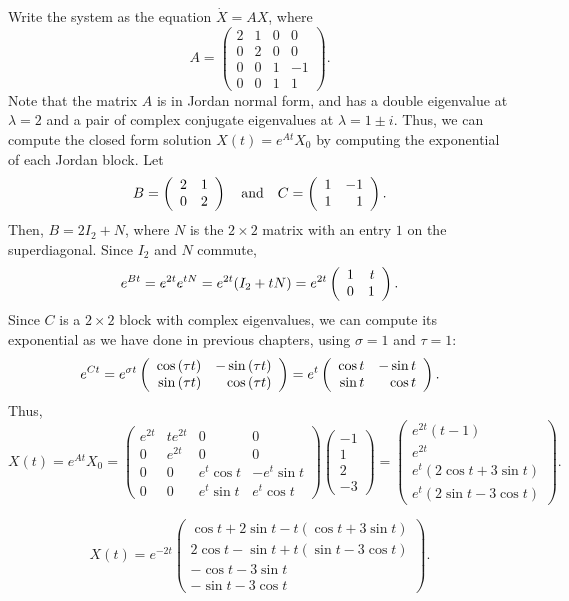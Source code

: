 \documentclass{ximera}
\begin{document}
\soln Write the system as the equation $\dot{X} = AX$, where
\[
A =
\left(\begin{array}{rrrr}
2 & 1 & 0 & 0 \\
0 & 2 & 0 & 0 \\
0 & 0 & 1 & -1 \\
0 & 0 & 1 & 1
\end{array}\right).
\]
Note that the matrix $A$ is in Jordan normal form, and has a double
eigenvalue at $\lambda = 2$ and a pair of complex conjugate eigenvalues
at $\lambda = 1 \pm i$.  Thus, we can compute the closed form solution
$X(t) = e^{At}X_0$ by computing the exponential of each Jordan block.  Let
\[
B = \left(\begin{array}{rr} 2 & 1\\ 0 &2\end{array}\right) \quad\mbox{and}\quad C = \left(\begin{array}{rr} 1 & -1\\ 1 &1\end{array}\right).
\]
Then, $B = 2I_2 + N$, where $N$ is the $2 \times 2$ matrix with an entry $1$
on the superdiagonal.  Since $I_2$ and $N$ commute,
\[
e^{Bt} = e^{2t}e^{tN} = e^{2t}(I_2 + tN) =
e^{2t}\left(\begin{array}{rr} 1 & t\\ 0 &1\end{array}\right).
\]
Since $C$ is a $2 \times 2$ block with complex eigenvalues, we can
compute its exponential as we have done in previous chapters, using
$\sigma = 1$ and $\tau = 1$:
\[
e^{Ct} = e^{\sigma t}\left(\begin{array}{rr} \cos{(\tau t)} & -\sin{(\tau t)}\\ \sin{(\tau t)} &\cos{(\tau t)}\end{array}\right)
= e^{t}\left(\begin{array}{rr} \cos{t} & -\sin{t}\\ \sin{t} &\cos{t}\end{array}\right).
\]
Thus,
\[
X(t) = e^{At}X_0 =
\left(\begin{array}{cccc}
e^{2t} & te^{2t} & 0 & 0 \\
0 & e^{2t} & 0 & 0 \\
0 & 0 & e^t\cos{t} & -e^t\sin{t} \\
0 & 0 & e^t\sin{t} & e^t\cos{t}
\end{array}\right)
\left(\begin{array}{r} -1 \\ 1 \\ 2 \\ -3 \end{array}\right)
= \left(\begin{array}{c}
e^{2t}(t - 1) \\
e^{2t} \\
e^t(2\cos{t} + 3\sin{t}) \\
e^t(2\sin{t} - 3\cos{t})
\end{array}\right).
\]

 \ans
\[
X(t) = e^{-2t}
\left(\begin{array}{c}
\cos t + 2\sin t - t(\cos t + 3\sin t) \\
2\cos t - \sin t + t(\sin t - 3\cos t) \\
-\cos t - 3\sin t \\
-\sin t - 3\cos t
\end{array}\right).
\]
\end{document}
